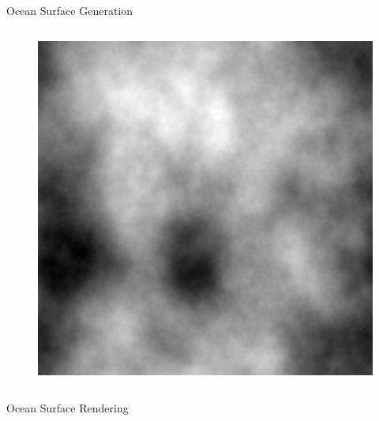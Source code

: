 \documentclass[final,hyperref={pdfpagelabels=true}]{beamer}
\begin{document}
\begin{frame}
\begin{center}
\begin{minipage}{\textwidth}
\begin{block}{Ocean Surface Generation}
\begin{columns}[t]
\begin{column}{0.45\linewidth}
\begin{figure}
					 {
					 \includegraphics[width=0.3\columnwidth]{figures/u_30_500km_heights.png}
					 }
					 \hfill
					 \hfill
					\end{figure}
				\end{column}	  
			\end{columns}
		\end{block}
	\end{minipage}
	\begin{minipage}{\textwidth}
		\begin{block}{Ocean Surface Rendering}
			\begin{columns}[t]
				\begin{column}{0.95\linewidth}
					\begin{figure}
					\centering

\end{figure}
\end{column}
\end{columns}
\end{block}
\end{minipage}
\end{center}
\end{frame}
\end{document}

